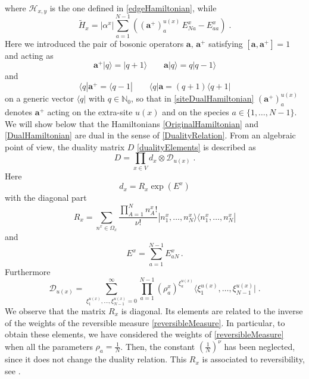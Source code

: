 \documentclass[10pt]{article}
\numberwithin{equation}{section}
\numberwithin{equation}{subsection}
\newcommand{\dt}{\;.}
\newcommand{\dd}{\mathcal{D}_{u(x)}}
\begin{document}
where $\mathcal{H}_{x,y}$ is the one defined in \eqref{edgeHamiltonian}, while 
\begin{equation}\label{siteDualHamiltonian}
    \widetilde{H}_{x}=|\alpha^{x}|\sum_{a=1}^{N-1}\left((\mathbf{a}^{+})_{a}^{u(x)}\,E_{Na}^{x}-E_{aa}^{x}\right)\dt
\end{equation}
Here we introduced the pair of bosonic operators $\mathbf{a},\,\mathbf{a}^{+}$ satisfying $[\mathbf{a},\mathbf{a}^{+}]=1$ and acting as
\begin{equation}
	\mathbf{a}^{+}|q\rangle=|q+1\rangle\qquad \mathbf{a}|q\rangle=q|q-1\rangle
\end{equation}
and 
\begin{equation}\label{bosonic_2}
	\langle q|\mathbf{a}^{+}=\langle q-1|\qquad \langle q|\mathbf{a}=(q+1) \langle q+1|
\end{equation}
on a generic vector $\langle q|$ with $q\in \mathbb{N}_{0}$, so that in \eqref{siteDualHamiltonian} 
$(\mathbf{a}^{+})_{a}^{u(x)}$ denotes  $\mathbf{a}^{+}$ acting on the extra-site $u(x)$ and on the species $a\in\{1,\ldots,N-1\}$. \\

We will show below that the Hamiltonians \eqref{OriginalHamiltonian} and \eqref{DualHamiltonian} are dual in the sense of \eqref{DualityRelation}. From an algebraic point of view, the duality matrix $D$ \eqref{dualityElements} is described as 
\begin{equation}\label{dualityMatrix}
    D=\prod_{x\in V}d_{x}\otimes \dd \;.
\end{equation}
Here
\begin{equation}\label{bulkElementDualityMatrix}
d_{x}=R_{x}\exp{(E^{x})}
\end{equation}
with  the diagonal part
\begin{equation}\label{Revmatrix}
    R_{x} =\sum_{n^{x}\in\Omega_{x}}\frac{\prod_{A=1}^{N}n_{A}^{x}!}{\nu!}|n_{1}^{x},\ldots,n_{N}^{x}\rangle\langle n_{1}^{x},\ldots,n_{N}^{x}|
\end{equation}
and
\begin{equation}\label{EquationEx}
E^{x}=\sum_{a=1}^{N-1}E_{aN}^{x}\,.
\end{equation}
Furthermore
\begin{equation}\label{dualityMatrix2}
\dd=\sum_{\xi_{1}^{u(x)},\ldots,\xi_{N-1}^{u(x)}=0}^{\infty}\prod_{a=1}^{N-1}\left(\rho_{a}^{x}\right)^{\xi_{a}^{u(x)}}\langle \xi_{1}^{u(x)},\ldots,\xi_{N-1}^{u(x)}|\dt
\end{equation}
We observe that the matrix $R_{x}$ is diagonal. Its elements are related to the inverse of the weights of the reversible measure \eqref{reversibleMeasure}. In particular, to obtain these elements, we have considered the weights of \eqref{reversibleMeasure} when all the parameters $\rho_{a}=\frac{1}{N}$. Then, the constant $\left(\frac{1}{N}\right)^{\nu}$ has been neglected, since it does not change the duality relation. This $R_{x}$   is associated to reversibility, see \cite{giardina2009duality}. \\
\end{document}
